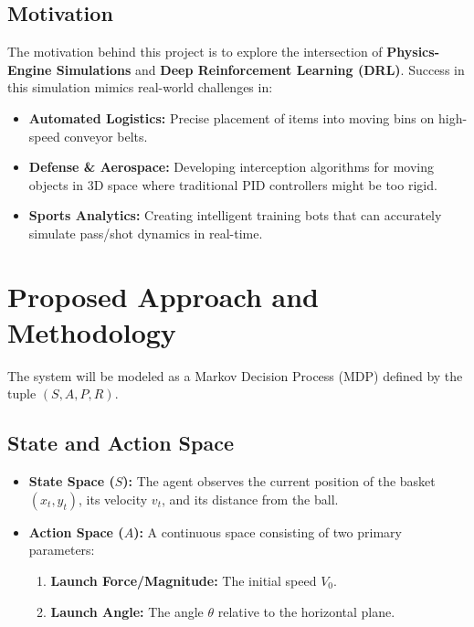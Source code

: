 \documentclass[a4paper,11pt,notitlepage]{report}
\begin{document}
\subsection*{Motivation}
The motivation behind this project is to explore the intersection of \textbf{Physics-Engine Simulations} and \textbf{Deep Reinforcement Learning (DRL)}. Success in this simulation mimics real-world challenges in:
\begin{itemize}
    \item \textbf{Automated Logistics:} Precise placement of items into moving bins on high-speed conveyor belts.
    \item \textbf{Defense \& Aerospace:} Developing interception algorithms for moving objects in 3D space where traditional PID controllers might be too rigid.
    \item \textbf{Sports Analytics:} Creating intelligent training bots that can accurately simulate pass/shot dynamics in real-time.
\end{itemize}

\section*{Proposed Approach and Methodology}
The system will be modeled as a Markov Decision Process (MDP) defined by the tuple $(S, A, P, R)$.

\subsection*{State and Action Space}
\begin{itemize}
    \item \textbf{State Space ($S$):} The agent observes the current position of the basket $(x_t, y_t)$, its velocity $v_t$, and its distance from the ball.
    \item \textbf{Action Space ($A$):} A continuous space consisting of two primary parameters:
    \begin{enumerate}
        \item \textbf{Launch Force/Magnitude:} The initial speed $V_0$.
        \item \textbf{Launch Angle:} The angle $\theta$ relative to the horizontal plane.
    \end{enumerate}
\end{itemize}
\end{document}
